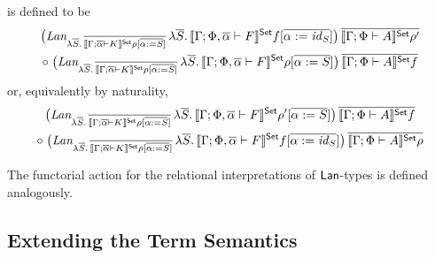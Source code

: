 \documentclass{lmcs}
\theoremstyle{plain}\newtheorem{satz}[thm]{Satz}
\renewcommand{\id}{\mathit{id}}
\begin{document}
\noindent
is defined to be 
\begin{multline*}
\big(\textit{Lan}_{\lambda \ol{S}.\,\ol{\setsem{\Gamma; \ol\alpha
      \vdash K}\rho[\ol{\alpha := S}]}}\,  
      \lambda \ol{S}.\,\setsem{\Gamma; \Phi, \ol\alpha \vdash
        F}f[\ol{\alpha := \id_S}]\big)\, 
    \ol{\setsem{\Gamma; \Phi \vdash A}\rho'} \\
\circ\;
  \big(\textit{Lan}_{\lambda \ol{S}.\,\ol{\setsem{\Gamma; \ol\alpha
        \vdash K}\rho[\ol{\alpha := S}]}}\,  
      \lambda \ol{S}.\,\setsem{\Gamma; \Phi, \ol\alpha \vdash
        F}\rho[\ol{\alpha := S}]\big)\, 
    \ol{\setsem{\Gamma; \Phi \vdash A}f}
\end{multline*}
or, equivalently by naturality,
\begin{multline*}
\big(\textit{Lan}_{\lambda \ol{S}.\,\ol{\setsem{\Gamma; \ol\alpha
      \vdash K}\rho[\ol{\alpha := S}]}}\, 
      \lambda \ol{S}.\,\setsem{\Gamma; \Phi, \ol\alpha \vdash
        F}\rho'[\ol{\alpha := S}]\big)\, 
    \ol{\setsem{\Gamma; \Phi \vdash A}f} \\
\circ\;
  \big(\textit{Lan}_{\lambda \ol{S}.\,\ol{\setsem{\Gamma; \ol\alpha
        \vdash K}\rho[\ol{\alpha := S}]}}\, 
     \lambda \ol{S}.\, \setsem{\Gamma; \Phi, \ol\alpha \vdash
       F}f[\ol{\alpha := \id_S}]\big)\, 
    \ol{\setsem{\Gamma; \Phi \vdash A}\rho}
\end{multline*}

\vspace*{0.05in}

\noindent
The functorial action for the relational interpretations of
$\mathsf{Lan}$-types is defined analogously.

\subsection{Extending the Term Semantics}\label{sec:term-sem}
\end{document}
